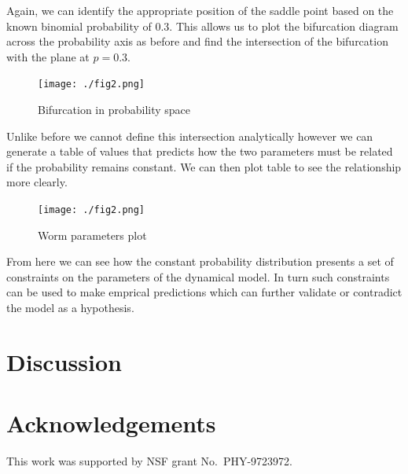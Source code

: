 \documentclass[letterpaper]{article}
\begin{document}
Again, we can identify the appropriate 
position of the saddle point based on the known binomial probability of 0.3. This 
allows us to plot the bifurcation diagram across the probability axis as before and find
the intersection of the bifurcation with the plane at $p=0.3$.

\begin{figure}[t]
\begin{center}
\texttt{[image: ./fig2.png]}
\caption{Bifurcation in probability space}
\label{fig6}
\end{center}
\end{figure}

Unlike before we cannot define this intersection analytically however we can
generate a table of values that predicts how the two parameters must be related
if the probability remains constant. We can then plot table to see the relationship
more clearly.

\begin{figure}[t]
\begin{center}
\texttt{[image: ./fig2.png]}
\caption{Worm parameters plot}
\label{fig7}
\end{center}
\end{figure}

From here we can see how the constant probability distribution presents a set of 
constraints on the parameters of the dynamical model. In turn such constraints can
be used to make emprical predictions which can further validate or contradict the
model as a hypothesis.

\section{Discussion}

\pagebreak

\section{Acknowledgements}

This work was supported by NSF grant No.\ PHY-9723972.

\footnotesize

\end{document}
